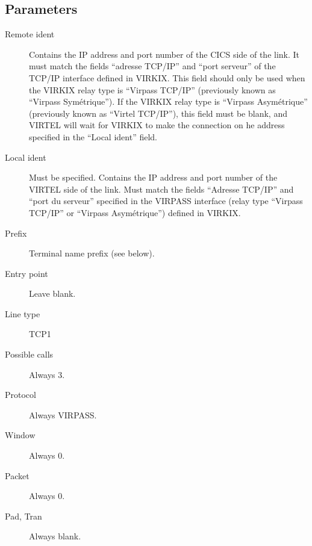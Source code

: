 \documentclass[letterpaper,10pt,english]{sphinxmanual}
\begin{document}
\subsection{Parameters}
\label{\detokenize{connectivity_guide:id16}}\label{\detokenize{connectivity_guide:index-43}}\begin{description}
\item[{Remote ident}] \leavevmode
Contains the IP address and port number of the CICS side of the link. It must match the fields “adresse TCP/IP” and “port serveur” of the TCP/IP interface defined in VIRKIX. This field should only be used when the VIRKIX relay type is “Virpass TCP/IP” (previously known as “Virpass Symétrique”). If the VIRKIX relay type is “Virpass Asymétrique” (previously known as “Virtel TCP/IP”), this field must be blank, and VIRTEL will wait for VIRKIX to make the connection on he address specified in the “Local ident” field.

\item[{Local ident}] \leavevmode
Must be specified. Contains the IP address and port number of the VIRTEL side of the link. Must match the fields “Adresse TCP/IP” and “port du serveur” specified in the VIRPASS interface (relay type “Virpass TCP/IP” or “Virpass Asymétrique”) defined in VIRKIX.

\item[{Prefix}] \leavevmode
Terminal name prefix (see below).

\item[{Entry point}] \leavevmode
Leave blank.

\item[{Line type}] \leavevmode
TCP1

\item[{Possible calls}] \leavevmode
Always 3.

\item[{Protocol}] \leavevmode
Always VIRPASS.

\item[{Window}] \leavevmode
Always 0.

\item[{Packet}] \leavevmode
Always 0.

\item[{Pad, Tran}] \leavevmode
Always blank.

\end{description}

\end{document}
